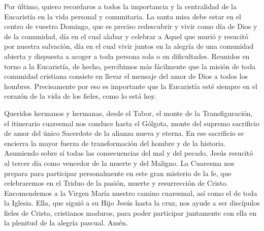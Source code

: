 \begin{body}
[\ldots]

Por último, quiero recordaros a todos la importancia y la centralidad de la Eucaristía en la vida personal y comunitaria. La santa misa debe estar en el centro de vuestro Domingo, que es preciso redescubrir y vivir como día de Dios y de la comunidad, día en el cual alabar y celebrar a Aquel que murió y resucitó por nuestra salvación, día en el cual vivir juntos en la alegría de una comunidad abierta y dispuesta a acoger a toda persona sola o en dificultades. Reunidos en torno a la Eucaristía, de hecho, percibimos más fácilmente que la misión de toda comunidad cristiana consiste en llevar el mensaje del amor de Dios a todos los hombres. Precisamente por eso es importante que la Eucaristía esté siempre en el corazón de la vida de los fieles, como lo está hoy.

Queridos hermanos y hermanas, desde el Tabor, el monte de la Transfiguración, el itinerario cuaresmal nos conduce hasta el Gólgota, monte del supremo sacrificio de amor del único Sacerdote de la alianza nueva y eterna. En ese sacrificio se encierra la mayor fuerza de transformación del hombre y de la historia. Asumiendo sobre sí todas las consecuencias del mal y del pecado, Jesús resucitó al tercer día como vencedor de la muerte y del Maligno. La Cuaresma nos prepara para participar personalmente en este gran misterio de la fe, que celebraremos en el Triduo de la pasión, muerte y resurrección de Cristo. Encomendemos a la Virgen María nuestro camino cuaresmal, así como el de toda la Iglesia. Ella, que siguió a su Hijo Jesús hasta la cruz, nos ayude a ser discípulos fieles de Cristo, cristianos maduros, para poder participar juntamente con ella en la plenitud de la alegría pascual. Amén.
\end{body}

